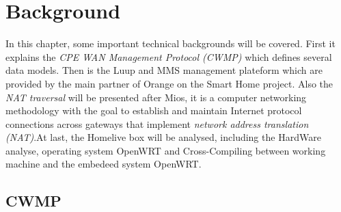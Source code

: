 
\chapter{Background} %

\label{Chapter3} %




In this chapter, some important technical backgrounds will be covered. First it explains the \textit{CPE WAN Management Protocol (CWMP)} which defines several data models. Then is the Luup and MMS management plateform which are provided by the main partner of Orange on the Smart Home project. Also the \textit{NAT traversal} will be presented after Mios, it is a computer networking methodology with the goal to establish and maintain Internet protocol connections across gateways that implement \textit{network address translation (NAT)}.At last, the Homelive box will be analysed, including the HardWare analyse, operating system OpenWRT and Cross-Compiling between working machine and the embedeed system OpenWRT.

\section{CWMP}

